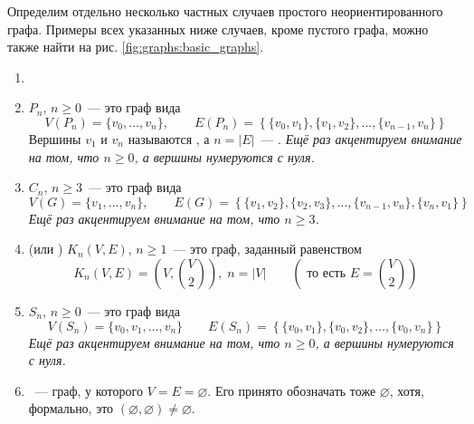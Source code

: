 Определим отдельно несколько частных случаев простого неориентированного графа.
Примеры всех указанных ниже случаев, кроме пустого графа, можно также найти на рис. \ref{fig:graphs:basic_graphs}.
\begin{definition}
    \label{def:graphs:named_graphs}
    \begin{enumerate}[label=\arabic*)]
        \item[]
        \item
             $ P_n $, $ n \geqslant 0 $~--- это граф вида
            \[
                V(P_n) = \{ v_0, \ldots, v_n \}, \qquad
                E(P_n) = \left\{ \{v_0, v_1\}, \{v_1, v_2\}, \ldots, \{v_{n-1}, v_n\} \right\}
            \]
            Вершины $ v_1 $ и $ v_n $ называются , а $ n = |E| $~--- .
            \textit{Ещё раз акцентируем внимание на том, что $ n \geqslant 0 $, а вершины нумеруются с нуля.}
        \item
             $ C_n $, $ n \geqslant 3 $~--- это граф вида
            \[
                V(G) = \{ v_1, \ldots, v_n \}, \qquad
                E(G) = \left\{ \{v_1, v_2\}, \{v_2, v_3\}, \ldots, \{v_{n-1}, v_n\}, \{v_n, v_1\} \right\}
            \]
            \textit{Ещё раз акцентируем внимание на том, что $ n \geqslant 3 $.}
        \item
             (или ) $ K_n(V, E) $, $ n \geqslant 1 $~--- это граф, заданный равенством
            \[
                K_n(V, E) = \left( V, \binom{V}{2} \right), \; n = |V| \qquad \left(\text{ то есть } E = \binom{V}{2} \right)
            \]
        \item
             $ S_n $, $ n \geqslant 0 $~--- это граф вида
            \[
                V(S_n) = \{ v_0, v_1, \ldots, v_n \} \qquad
                E(S_n) = \left\{ \{v_0, v_1\}, \{v_0, v_2\}, \ldots, \{v_0, v_n\} \right\}
            \]
            \textit{Ещё раз акцентируем внимание на том, что $ n \geqslant 0 $, а вершины нумеруются с нуля.}
        \item
            ~--- граф, у которого $ V = E = \varnothing $.
            Его принято обозначать тоже $ \varnothing $, хотя, формально, это $ (\varnothing, \varnothing) \neq \varnothing $.
    \end{enumerate}
\end{definition}


